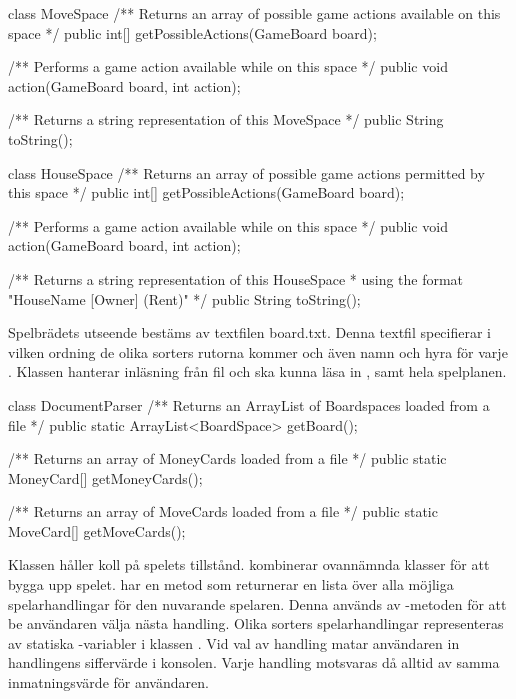 \begin{JavaSpec}{class MoveSpace}
    /** Returns an array of possible game actions available on this space */
    public int[] getPossibleActions(GameBoard board);

    /** Performs a game action available while on this space */
    public void action(GameBoard board, int action);

    /** Returns a string representation of this MoveSpace */
   public String toString();
\end{JavaSpec}

\begin{JavaSpec}{class HouseSpace}
    /** Returns an array of possible game actions permitted by this space */
    public int[] getPossibleActions(GameBoard board);

    /** Performs a game action available while on this space */
    public void action(GameBoard board, int action);

    /** Returns a string representation of this HouseSpace
     *  using the format "HouseName [Owner] (Rent)" */
   public String toString();
\end{JavaSpec}

Spelbrädets utseende bestäms av textfilen board.txt. Denna textfil specifierar i vilken ordning de olika sorters rutorna kommer och även namn och hyra för varje . Klassen  hanterar inläsning från fil och ska kunna läsa in ,  samt hela spelplanen.

\begin{JavaSpec}{class DocumentParser}
	/** Returns an ArrayList of Boardspaces loaded from a file */
	public static ArrayList<BoardSpace> getBoard();

	/** Returns an array of MoneyCards loaded from a file */
	public static MoneyCard[] getMoneyCards();

	/** Returns an array of MoveCards loaded from a file */
	public static MoveCard[] getMoveCards();
\end{JavaSpec}


Klassen  håller koll på spelets tillstånd.
 kombinerar ovannämnda klasser för att bygga upp spelet.  har en metod  som returnerar en lista över alla möjliga spelarhandlingar för den nuvarande spelaren. Denna används av -metoden för att be användaren välja nästa handling.
Olika sorters spelarhandlingar representeras av statiska -variabler i klassen . Vid val av handling matar användaren in handlingens siffervärde i konsolen. Varje handling motsvaras då alltid av samma inmatningsvärde för användaren.


